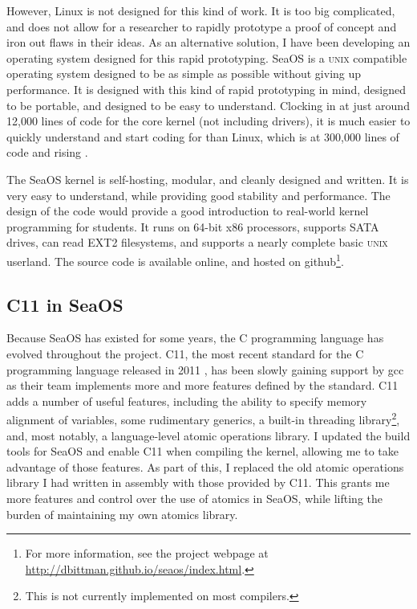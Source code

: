 \documentclass[12pt]{article}
\begin{document}
However, Linux is not designed for this kind of work. It is too big
complicated, and does not allow for a researcher to rapidly prototype a
proof of concept and iron out flaws in their ideas. As an alternative solution,
I have been developing
an operating system designed for this rapid prototyping. SeaOS is a \textsc{unix} compatible
operating system designed to be as simple as possible without giving up
performance. It is designed with this kind of rapid prototyping in mind,
designed to be portable, and designed to be easy to understand. Clocking
in at just around 12,000 lines of code for the core kernel (not including drivers), it is much easier to quickly understand and start coding for than
Linux, which is at 300,000 lines of code and rising \cite{linuxsource}. 

The SeaOS kernel is self-hosting, modular, and cleanly designed and written. It is
very easy to understand, while providing good stability and performance. The design
of the code would provide a good introduction to real-world kernel programming
for students. It runs on 64-bit x86 processors, supports SATA drives, can read EXT2
filesystems, and supports a nearly complete basic \textsc{unix} userland. The source code
is available online, and hosted on github\footnote{For more information, see
the project webpage at \url{http://dbittman.github.io/seaos/index.html}.}.

\subsection{C11 in SeaOS}
Because SeaOS has existed for some years, the C programming language has
evolved throughout the project. C11, the most recent standard for the C programming language released
in 2011 \cite{iso-c11}, has been slowly gaining support by gcc as their team implements more and more
features defined by the standard. C11 adds a number of useful features, including the ability to specify
memory alignment of variables, some rudimentary generics, a built-in threading library\footnote{This is not currently
implemented on most compilers.}, and,
most notably,
a language-level atomic operations library. I updated the build tools for SeaOS
and enable C11 when compiling the kernel, allowing me to take advantage of those features.
As part of this, I replaced the old atomic operations library I had written in assembly
with those provided by C11. This grants me more features and control over the
use of atomics in SeaOS, while lifting the burden of maintaining my own atomics library.
\end{document}
